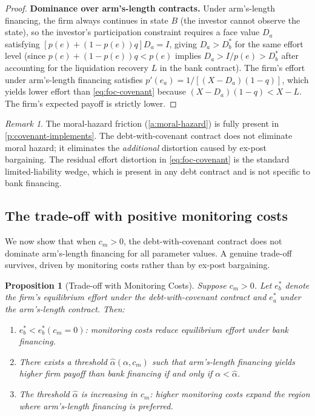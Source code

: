 \documentclass[12pt,a4paper]{article}
\theoremstyle{plain}
\newtheorem{proposition}[theorem]{Proposition}
\theoremstyle{definition}
\theoremstyle{remark}
\newtheorem{remark}[theorem]{Remark}
\begin{document}
\begin{proof}
\textbf{Dominance over arm's-length contracts.} Under arm's-length financing, the firm always continues in state $B$ (the investor cannot observe the state), so the investor's participation constraint requires a face value $D_a$ satisfying $[p(e) + (1-p(e))q]D_a = I$, giving $D_a > D_b^*$ for the same effort level (since $p(e) + (1-p(e))q < p(e)$ implies $D_a > I/p(e) > D_b^*$ after accounting for the liquidation recovery $L$ in the bank contract). The firm's effort under arm's-length financing satisfies $p'(e_a) = 1/[(X - D_a)(1-q)]$, which yields lower effort than \cref{eq:foc-covenant} because $(X - D_a)(1-q) < X - L$. The firm's expected payoff is strictly lower.
\end{proof}

\begin{remark}
\label{r:moral-hazard-survives}
The moral-hazard friction (\cref{a:moral-hazard}) is fully present in \cref{p:covenant-implements}. The debt-with-covenant contract does not eliminate moral hazard; it eliminates the \emph{additional} distortion caused by ex-post bargaining. The residual effort distortion in \cref{eq:foc-covenant} is the standard limited-liability wedge, which is present in any debt contract and is not specific to bank financing.
\end{remark}

\subsection{The trade-off with positive monitoring costs}
\label{sec:monitoring-costs}

We now show that when $c_m > 0$, the debt-with-covenant contract does not dominate arm's-length financing for all parameter values. A genuine trade-off survives, driven by monitoring costs rather than by ex-post bargaining.

\begin{proposition}[Trade-off with Monitoring Costs]
\label{p:tradeoff-monitoring}
Suppose $c_m > 0$. Let $e_b^*$ denote the firm's equilibrium effort under the debt-with-covenant contract and $e_a^*$ under the arm's-length contract. Then:
\begin{enumerate}[nosep,label=(\alph*)]
\item $e_b^* < e_b^*(c_m = 0)$: monitoring costs reduce equilibrium effort under bank financing.
\item There exists a threshold $\hat{\alpha}(\alpha, c_m)$ such that arm's-length financing yields higher firm payoff than bank financing if and only if $\alpha < \hat{\alpha}$.
\item The threshold $\hat{\alpha}$ is increasing in $c_m$: higher monitoring costs expand the region where arm's-length financing is preferred.
\end{enumerate}
\end{proposition}
\end{document}
